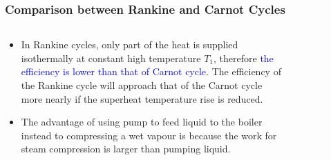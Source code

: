 \documentclass[10pt,compress,handout,ignorenonframetext]{beamer}
\begin{document}
\begin{frame}
 \frametitle{Comparison between Rankine and Carnot Cycles}
  \begin{columns}
   \begin{column}[c]{0.4\linewidth}
    \begin{itemize}%
     \item <1-> In Rankine cycles, only part of the heat is supplied isothermally at constant high temperature $T_{1}$, therefore \textcolor{blue}{the efficiency is lower than that of Carnot cycle}. The efficiency of the Rankine cycle will approach that of the Carnot cycle more nearly if the superheat temperature rise is reduced.
     \item <2-> The advantage of using pump to feed liquid to the boiler instead to compressing a wet vapour is because the work for steam compression is larger than pumping liquid.
    \end{itemize}
   \end{column}
   \begin{column}[c]{0.6\linewidth}
    \begin{figure}%
     \begin{center}
      \includegraphics[width=7.5cm,clip]{./Pics/Comparison_Rankine_Carnot}
     \end{center}
    \end{figure}  
   \end{column}
  \end{columns}
 \normalsize
\end{frame}
\end{document}
